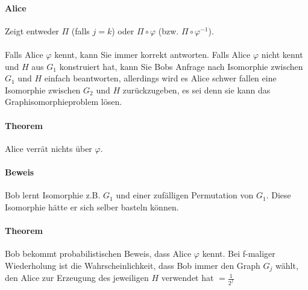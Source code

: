\paragraph*{Alice} Zeigt entweder $\Pi$ (falls $j=k$) oder $\Pi \circ \varphi$ (bzw. $\Pi \circ \varphi^{-1}$).


\paragraph*{} Falls Alice $\varphi$ kennt, kann Sie immer korrekt antworten. Falls Alice $\varphi$ nicht kennt und $H$ aus $G_1$ konstruiert hat, kann Sie Bobs Anfrage nach Isomorphie zwischen $G_1$ und $H$ einfach beantworten, allerdings wird es Alice schwer fallen eine Isomorphie zwischen $G_2$ und $H$ zurückzugeben, es sei denn sie kann das Graphisomorphieproblem lösen.

\paragraph*{Theorem} Alice verrät nichts über $\varphi$.

\paragraph*{Beweis} Bob lernt Isomorphie z.B. $G_1$ und einer zufälligen Permutation von $G_1$. Diese Isomorphie hätte er sich selber basteln können.

\paragraph*{Theorem} Bob bekommt probabilistischen Beweis, dass Alice $\varphi$ kennt. Bei f-maliger Wiederholung ist die Wahrscheinlichkeit, dass Bob immer den Graph $G_j$ wählt, den Alice zur Erzeugung des jeweiligen $H$ verwendet hat $= \frac{1}{2^f}$